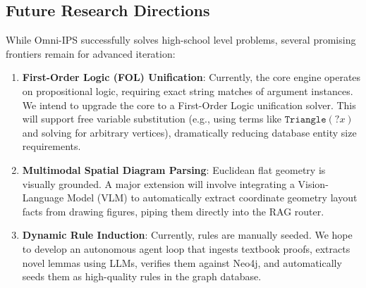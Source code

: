 \subsection{Future Research Directions}
While Omni-IPS successfully solves high-school level problems, several promising frontiers remain for advanced iteration:
\begin{enumerate}
    \item \textbf{First-Order Logic (FOL) Unification}:
        Currently, the core engine operates on propositional logic, requiring exact string matches of argument instances. We intend to upgrade the core to a First-Order Logic unification solver. This will support free variable substitution (e.g., using terms like $\texttt{Triangle}(?x)$ and solving for arbitrary vertices), dramatically reducing database entity size requirements.
    \item \textbf{Multimodal Spatial Diagram Parsing}:
        Euclidean flat geometry is visually grounded. A major extension will involve integrating a Vision-Language Model (VLM) to automatically extract coordinate geometry layout facts from drawing figures, piping them directly into the RAG router.
    \item \textbf{Dynamic Rule Induction}:
        Currently, rules are manually seeded. We hope to develop an autonomous agent loop that ingests textbook proofs, extracts novel lemmas using LLMs, verifies them against Neo4j, and automatically seeds them as high-quality rules in the graph database.
\end{enumerate}

